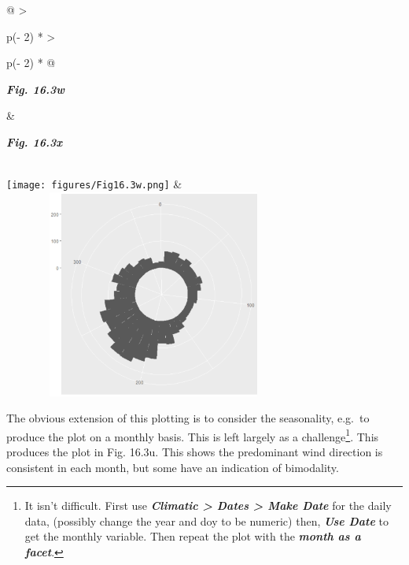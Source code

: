 \documentclass[
  letterpaper,
  DIV=11,
  numbers=noendperiod]{scrreprt}
\begin{document}
\begin{longtable}[]{@{}
  >{\raggedright\arraybackslash}p{(\columnwidth - 2\tabcolsep) * }
  >{\raggedright\arraybackslash}p{(\columnwidth - 2\tabcolsep) * }@{}}
\toprule\noalign{}
\begin{minipage}[b]{\linewidth}\raggedright
\textbf{\emph{Fig. 16.3w}}
\end{minipage} & \begin{minipage}[b]{\linewidth}\raggedright
\textbf{\emph{Fig. 16.3x}}
\end{minipage} \\
\midrule\noalign{}
\endhead
\bottomrule\noalign{}
\endlastfoot
\texttt{[image: figures/Fig16.3w.png]} &
\includegraphics[width=3.88977in,height=2.69512in]{figures/Fig16.3x.png} \\
\end{longtable}

The obvious extension of this plotting is to consider the seasonality,
e.g.~to produce the plot on a monthly basis. This is left largely as a
challenge\footnote{It isn't difficult. First use \textbf{\emph{Climatic
  \textgreater{} Dates \textgreater{} Make Date}} for the daily data,
  (possibly change the year and doy to be numeric) then,
  \textbf{\emph{Use Date}} to get the monthly variable. Then repeat the
  plot with the \textbf{\emph{month as a facet}}.}. This produces the
plot in Fig. 16.3u. This shows the predominant wind direction is
consistent in each month, but some have an indication of bimodality.
\end{document}
